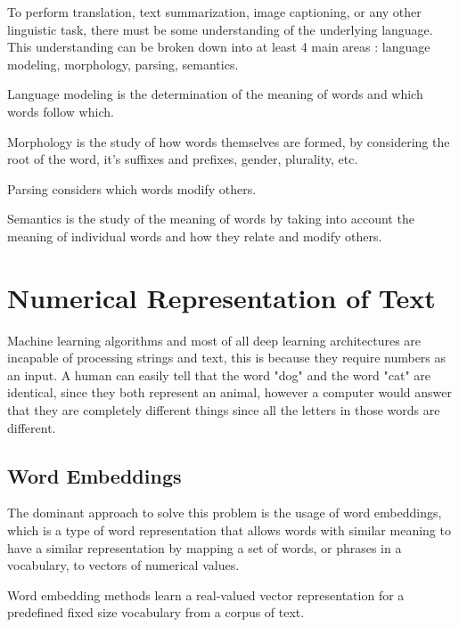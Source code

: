 To perform translation, text summarization, image captioning, or any other linguistic task, there must be some understanding of the underlying language. This understanding can be broken down into at least 4 main areas : language modeling, morphology, parsing, semantics. \par 

Language modeling is the determination of the meaning of words and which words follow which. \par

Morphology is the study of how words themselves are formed, by considering the root of the word, it's suffixes and prefixes, gender, plurality, etc.

Parsing considers which words modify others. \par

Semantics is the study of the meaning of words by taking into account the meaning of individual words  and how they relate and modify others. \cite{Otter2018} \par 



\section{Numerical Representation of Text}


\par Machine learning algorithms and most of all deep learning architectures are incapable of processing strings and text, this is because they require numbers as an input. \cite{Vidhya2017} A human can easily tell that the word "dog" and the word "cat" are identical, since they both represent an animal, however a computer would answer that they are completely different things since all the letters in those words are different. 

    \subsection{Word Embeddings}

    \par The dominant approach to solve this problem is the usage of word embeddings, which is a type of word representation that allows words with similar meaning to have a similar representation by mapping a set of words, or phrases in a vocabulary, to vectors of numerical values. 

    \par  Word embedding methods learn a real-valued vector representation for a predefined fixed size vocabulary from a corpus  of text. \cite{Brownlee2017}  
   
